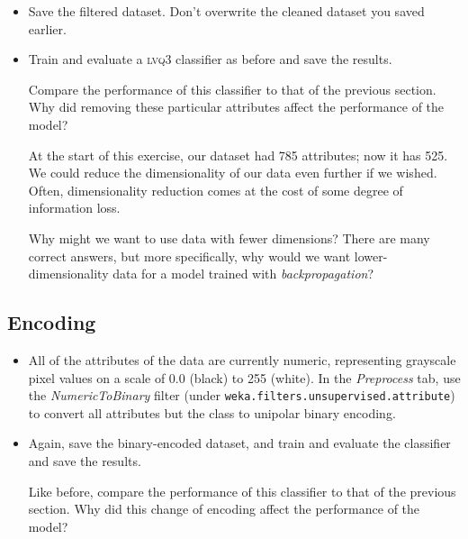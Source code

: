 \documentclass[11pt]{cselabheader}
\begin{document}
\begin{itemize}[leftmargin=*]
  \item Save the filtered dataset. Don't overwrite the cleaned dataset you saved earlier.

  \item Train and evaluate a \textsc{lvq3} classifier as before and save the results.

  \begin{ex}
    Compare the performance of this classifier to that of the previous section. Why did removing these particular attributes affect the performance of the model?
  \end{ex}

  \begin{ex}
    At the start of this exercise, our dataset had 785 attributes; now it has 525. We could reduce the dimensionality of our data even further if we wished. Often, dimensionality reduction comes at the cost of some degree of information loss.

    Why might we want to use data with fewer dimensions? There are many correct answers, but more specifically, why would we want lower-dimensionality data for a model trained with \emph{backpropagation}?
  \end{ex}
\end{itemize}

\subsection{Encoding}
\begin{itemize}[leftmargin=*]
  \item All of the attributes of the data are currently numeric, representing grayscale pixel values on a scale of 0.0 (black) to 255 (white). In the \emph{Preprocess} tab, use the \emph{NumericToBinary} filter (under \texttt{weka.filters.unsupervised.attribute}) to convert all attributes but the class to unipolar binary encoding.

  \item Again, save the binary-encoded dataset, and train and evaluate the classifier and save the results.

  \begin{ex}
    Like before, compare the performance of this classifier to that of the previous section. Why did this change of encoding affect the performance of the model?
  \end{ex}

\end{itemize}

\end{document}
